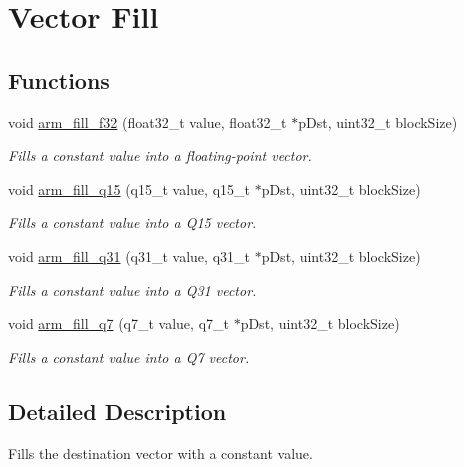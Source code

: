 \hypertarget{group__Fill}{}\section{Vector Fill}
\label{group__Fill}
\subsection*{Functions}
\begin{DoxyCompactItemize}
\item 
void \hyperlink{group__Fill_ga2248e8d3901b4afb7827163132baad94}{arm\+\_\+fill\+\_\+f32} (float32\+\_\+t value, float32\+\_\+t $\ast$p\+Dst, uint32\+\_\+t block\+Size)
\begin{DoxyCompactList}\small\item\em Fills a constant value into a floating-\/point vector. \end{DoxyCompactList}\item 
void \hyperlink{group__Fill_ga76b21c32a3783a2b3334d930a646e5d8}{arm\+\_\+fill\+\_\+q15} (q15\+\_\+t value, q15\+\_\+t $\ast$p\+Dst, uint32\+\_\+t block\+Size)
\begin{DoxyCompactList}\small\item\em Fills a constant value into a Q15 vector. \end{DoxyCompactList}\item 
void \hyperlink{group__Fill_ga69cc781cf337bd0a31bb85c772a35f7f}{arm\+\_\+fill\+\_\+q31} (q31\+\_\+t value, q31\+\_\+t $\ast$p\+Dst, uint32\+\_\+t block\+Size)
\begin{DoxyCompactList}\small\item\em Fills a constant value into a Q31 vector. \end{DoxyCompactList}\item 
void \hyperlink{group__Fill_ga0465cf326ada039ed792f94b033d9ec5}{arm\+\_\+fill\+\_\+q7} (q7\+\_\+t value, q7\+\_\+t $\ast$p\+Dst, uint32\+\_\+t block\+Size)
\begin{DoxyCompactList}\small\item\em Fills a constant value into a Q7 vector. \end{DoxyCompactList}\end{DoxyCompactItemize}


\subsection{Detailed Description}
Fills the destination vector with a constant value.



